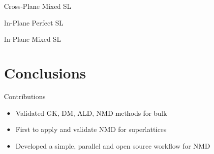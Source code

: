 \documentclass{beamer}
\begin{document}
\begin{frame}{Cross-Plane Mixed SL}
\begin{figure}[t]
\begin{center}
\vspace*{-0.8cm}
\renewcommand{\figure}{Fig.}
\label{fig:cp_all}
\end{center}
\end{figure}
\end{frame}

\begin{frame}{In-Plane Perfect SL}
\begin{figure}[t]
\begin{center}
\vspace*{-0.8cm}
\renewcommand{\figure}{Fig.}
\label{fig:ip}
\end{center}
\end{figure}
\end{frame}

\begin{frame}{In-Plane Mixed SL}
\begin{figure}[t]
\begin{center}
\vspace*{-0.8cm}
\renewcommand{\figure}{Fig.}
\label{fig:ip_all}
\end{center}
\end{figure}
\end{frame}

\section{Conclusions}
\begin{frame}{Contributions}
\begin{itemize}
\item Validated GK, DM, ALD, NMD methods for bulk
\item First to apply and validate NMD for superlattices
\item Developed a simple, parallel and open source workflow for NMD
\end{itemize}
\end{frame}
\end{document}
